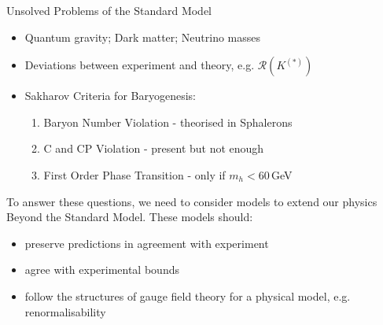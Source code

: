 \documentclass[10pt,xcolor={table,dvipsnames},t]{beamer}
\begin{document}
\begin{frame}{Unsolved Problems of the Standard Model}
    \begin{itemize}
        \item Quantum gravity; Dark matter; Neutrino masses
        \item Deviations between experiment and theory, e.g. $\mathcal{R}(K^{(*)})$
        \item Sakharov Criteria for Baryogenesis:
            \begin{enumerate}
                \item Baryon Number Violation - theorised in Sphalerons
                \item C and CP Violation - present but not enough
                \item First Order Phase Transition - only if $m_h<60\,$GeV 
            \end{enumerate}
    \end{itemize}
    To answer these questions, we need to consider models to extend our physics Beyond the Standard Model. 
    These models should:
    \begin{itemize}
        \item preserve predictions in agreement with experiment
        \item agree with experimental bounds
        \item follow the structures of gauge field theory for a physical model, e.g. renormalisability
    \end{itemize}
\end{frame}
\end{document}
